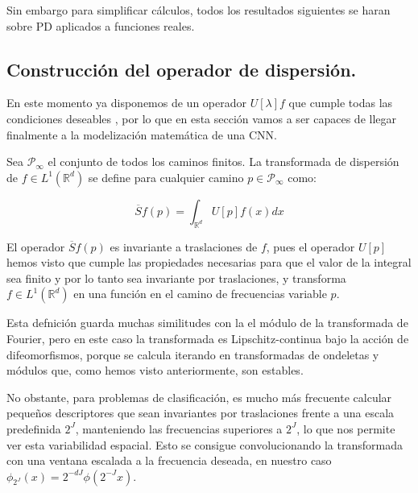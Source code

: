 \medskip

\noindent Sin embargo para simplificar cálculos, todos los resultados siguientes se haran sobre PD aplicados a funciones reales.

\subsection{Construcción del operador de dispersión.}

\noindent En este momento ya disponemos de un operador $U[\lambda] f$ que cumple todas las condiciones deseables , por lo que en esta sección vamos a ser capaces de llegar finalmente a la modelización matemática de una CNN.

\begin{definicion} \label{def:S_barra}
Sea $\mathcal{P}_\infty$ el conjunto de todos los caminos finitos. La transformada de dispersión de $f \in L^1(\mathbb{R}^d)$ se define para cualquier camino $p \in \mathcal{P}_\infty$ como:

\begin{equation}
  \overline{S}f(p)=\int_{\mathbb{R}^d}U[p]f(x)dx 
\end{equation}

\end{definicion}

\medskip

\noindent El operador $\overline{S}f(p)$ es invariante a traslaciones de $f$, pues el operador $U[p]$ hemos visto que cumple las propiedades necesarias para que el valor de la integral sea finito y por lo tanto sea invariante por traslaciones, y transforma $f \in L^1(\mathbb{R}^d)$ en una función en el camino de frecuencias variable $p$.

\medskip

\noindent Esta defnición guarda muchas similitudes con la el módulo de la transformada de Fourier, pero en este caso la transformada es Lipschitz-continua bajo la acción de difeomorfismos, porque se calcula iterando en transformadas de ondeletas y módulos que, como hemos visto anteriormente, son estables. 

\medskip

\noindent No obstante, para problemas de clasificación, es mucho más frecuente calcular pequeños descriptores que sean invariantes por traslaciones frente a una escala predefinida $2^J$, manteniendo las frecuencias superiores a $2^J$, lo que nos permite ver esta variabilidad espacial. Esto se consigue convolucionando la transformada con una ventana escalada a la frecuencia deseada, en nuestro caso $\phi_{2^J}(x)=2^{-dJ}\phi(2^{-J}x)$. 

